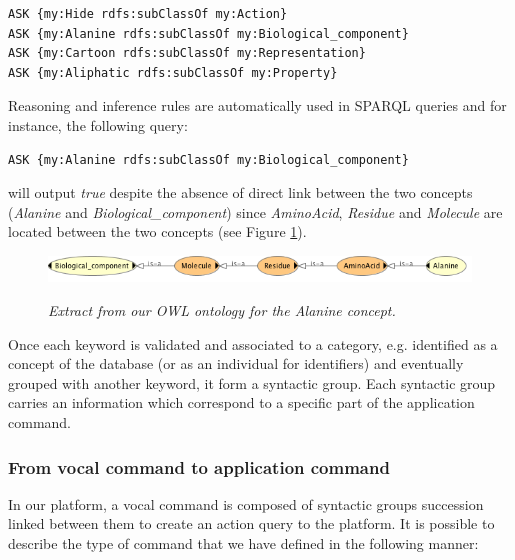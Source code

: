 \documentclass{vgtc}                          %
\begin{document}
\begin{lstlisting}[language=XML]
ASK {my:Hide rdfs:subClassOf my:Action}
ASK {my:Alanine rdfs:subClassOf my:Biological_component}
ASK {my:Cartoon rdfs:subClassOf my:Representation}
ASK {my:Aliphatic rdfs:subClassOf my:Property}
\end{lstlisting}

Reasoning and inference rules are automatically used in SPARQL queries and for instance, the following query:

\begin{lstlisting}[language=XML]
ASK {my:Alanine rdfs:subClassOf my:Biological_component}
\end{lstlisting}
\noindent
will output \textit{true} despite the absence of direct link between the two concepts (\textit{Alanine} and \textit{Biological\_component}) since \textit{AminoAcid}, \textit{Residue} and \textit{Molecule} are located between the two concepts (see Figure \ref{Fig:alanine_owl}).

\hspace{1cm}

\begin{figure}[!htb]
  \centering
  {\includegraphics[width=\linewidth]{./figures/alanine_to_bio_component_owl}}
    \caption[Extract from OWL ontology for the \textit{Alanine} concept.]{\it Extract from our OWL ontology for the \textit{Alanine} concept.}
  \label{Fig:alanine_owl}
\end{figure}

Once each keyword is validated and associated to a category, e.g. identified as a concept of the database (or as an individual for identifiers) and eventually grouped with another keyword, it form a syntactic group. Each syntactic group carries an information which correspond to a specific part of the application command.

\subsubsection{From vocal command to application command}

In our platform, a vocal command is composed of syntactic groups succession linked between them to create an action query to the platform. It is possible to describe the type of command that we have defined in the following manner:
\end{document}
